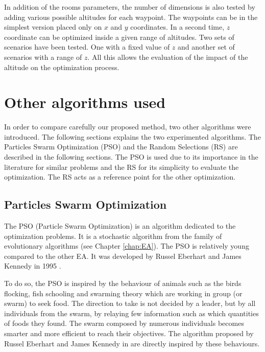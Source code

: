  

 In addition of the rooms parameters, the number of dimensions is also tested by adding various possible altitudes for each waypoint. The waypoints can be in the simplest version placed only on $x$ and $y$ coordinates. In a second time, $z$ coordinate can be optimized inside a given range of altitudes. 
 Two sets of scenarios have been tested. One with a fixed value of $z$ and another set of scenarios with a range of $z$.  All this allows the evaluation of the impact of the altitude on the optimization process.



\section{Other algorithms used}

In order to compare carefully our proposed method, two other algorithms were introduced. The following sections explains the two experimented algorithms. %
The Particles Swarm Optimization (PSO) and the Random Selections (RS) are described in the following sections. The PSO is used due to its importance in the literature for similar problems and the RS for its simplicity to evaluate the optimization. The RS  acts as a reference point for the other optimization.  

\subsection{Particles Swarm Optimization } \label{sec:PSOdetail}

The PSO (Particle Swarm Optimization) is an algorithm dedicated to the optimization problems. It is a stochastic algorithm from the family of evolutionary algorithms (see Chapter \ref{chap:EA}). 
The PSO is relatively young compared to the other EA. It was developed by Russel Eberhart and James Kennedy in 1995 \cite{148*eberhart1995}.%

To do so, the PSO is inspired by the behaviour of animals such as the birds flocking, fish schooling and swarming theory which are working in group (or swarm) to seek food. 
The direction to take is not decided by a leader, but by all individuals from the swarm, by relaying few information such as which quantities of foods they found. 
The swarm composed by numerous individuals becomes smarter and more efficient to reach their objectives. 
The algorithm proposed by Russel Eberhart and James Kennedy in  \cite{148*eberhart1995} are directly inspired by these behaviours.

